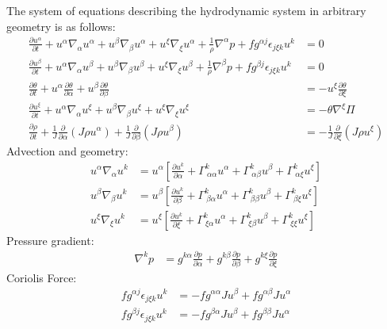 \documentclass{article}
\newcommand{\vb}{\mathbf}
\newcommand{\pdiff}[2]{\frac{\partial #1}{\partial #2}}
\begin{document}
The system of equations describing the hydrodynamic system in arbitrary geometry is as follows:
\begin{align}
\pdiff{u^\alpha}{t} + u^\alpha \nabla_\alpha u^\alpha + u^\beta \nabla_\beta u^\alpha + u^\xi \nabla_\xi u^\alpha + \frac{1}{\rho} \nabla^\alpha p + f g^{\alpha j} \epsilon_{j \xi k} u^k &= 0 \\
\pdiff{u^\beta}{t} + u^\alpha \nabla_\alpha u^\beta + u^\beta \nabla_\beta u^\beta + u^\xi \nabla_\xi u^\beta + \frac{1}{\rho} \nabla^\beta p + f g^{\beta j} \epsilon_{j \xi k} u^k &= 0 \\
\pdiff{\theta}{t} + u^\alpha \pdiff{\theta}{\alpha} + u^\beta \pdiff{\theta}{\beta} &= - u^\xi \pdiff{\theta}{\xi} \\
\pdiff{u^\xi}{t} + u^\alpha \nabla_\alpha u^\xi + u^\beta \nabla_\beta u^\xi + u^\xi \nabla_\xi u^\xi &= - \theta \nabla^\xi \Pi \\
\pdiff{\rho}{t} + \frac{1}{J} \pdiff{}{\alpha} (J \rho u^\alpha) + \frac{1}{J} \pdiff{}{\beta} (J \rho u^\beta) &= - \frac{1}{J} \pdiff{}{\xi} (J \rho u^\xi)
\end{align}
Advection and geometry:
\begin{align}
u^\alpha \nabla_\alpha u^k &= u^\alpha \left[ \pdiff{u^k}{\alpha} + \Gamma^k_{\ \alpha \alpha} u^\alpha + \Gamma^k_{\ \alpha \beta} u^\beta + \Gamma^k_{\ \alpha \xi} u^\xi \right] \\
u^\beta \nabla_\beta u^k &= u^\beta \left[ \pdiff{u^k}{\beta} + \Gamma^k_{\ \beta \alpha} u^\alpha + \Gamma^k_{\ \beta \beta} u^\beta + \Gamma^k_{\ \beta \xi} u^\xi \right] \\
u^\xi \nabla_\xi u^k &= u^\xi \left[ \pdiff{u^k}{\xi} + \Gamma^k_{\ \xi \alpha} u^\alpha + \Gamma^k_{\ \xi \beta} u^\beta + \Gamma^k_{\ \xi \xi} u^\xi \right]
\end{align}
Pressure gradient:
\begin{align}
\nabla^k p &= g^{k \alpha} \pdiff{p}{\alpha} + g^{k \beta} \pdiff{p}{\beta} + g^{k \xi} \pdiff{p}{\xi}
\end{align}
Coriolis Force:
\begin{align}
f g^{\alpha j} \epsilon_{j \xi k} u^k &= - f g^{\alpha \alpha} J u^\beta + f g^{\alpha \beta} J u^\alpha \\
f g^{\beta j} \epsilon_{j \xi k} u^k &= - f g^{\beta \alpha} J u^\beta + f g^{\beta \beta} J u^\alpha
\end{align}

\end{document}
